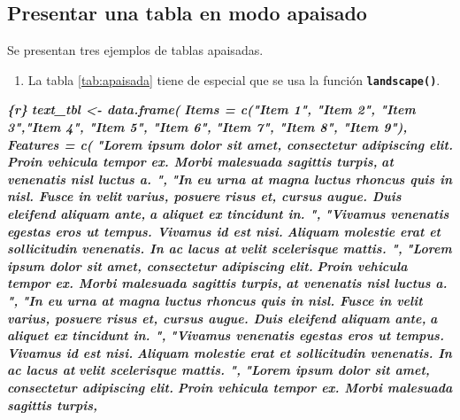 \documentclass[12pt,a4paper,oneside,]{book}
\newenvironment{Shaded}{\begin{snugshade}}{\end{snugshade}}
\newcommand{\InformationTok}[1]{\textcolor[rgb]{0.56,0.35,0.01}{\textbf{\textit{#1}}}}
\providecommand{\tightlist}{%
  \setlength{\itemsep}{0pt}\setlength{\parskip}{0pt}}
\numberwithin{dummy}{section}
\theoremstyle{ocrenumbox}
\theoremstyle{blacknumex}
\theoremstyle{blacknumbox}
\theoremstyle{ocrenum}
\theoremstyle{ocrenum}
\begin{document}
\hypertarget{presentar-una-tabla-en-modo-apaisado}{%
\subsection{Presentar una tabla en modo
apaisado}\label{presentar-una-tabla-en-modo-apaisado}}

Se presentan tres ejemplos de tablas apaisadas.

\begin{enumerate}
\def\labelenumi{\arabic{enumi}.}
\tightlist
\item
  La tabla \ref{tab:apaisada} tiene de especial que se usa la función
  \textbf{\texttt{landscape()}}.
\end{enumerate}

\begin{Shaded}
\begin{Highlighting}[]
\InformationTok{\textasciigrave{}\textasciigrave{}\textasciigrave{}\{r\}}
\InformationTok{text\_tbl \textless{}{-} data.frame(}
\InformationTok{  Items = c("Item 1", "Item 2", "Item 3","Item 4", "Item 5", "Item 6",}
\InformationTok{    "Item 7", "Item 8", "Item 9"), }
\InformationTok{  Features = c(}
\InformationTok{    "Lorem ipsum dolor sit amet, consectetur adipiscing elit.}
\InformationTok{    Proin vehicula tempor ex. Morbi malesuada sagittis turpis,}
\InformationTok{    at venenatis nisl luctus a. ",}
\InformationTok{    "In eu urna at magna luctus rhoncus quis in nisl. Fusce in velit}
\InformationTok{    varius, posuere risus et, cursus augue. Duis eleifend aliquam ante,}
\InformationTok{    a aliquet ex tincidunt in. ",}
\InformationTok{    "Vivamus venenatis egestas eros ut tempus. Vivamus id est nisi.}
\InformationTok{    Aliquam molestie erat et sollicitudin venenatis. In ac lacus at}
\InformationTok{    velit scelerisque mattis. ",}
\InformationTok{    "Lorem ipsum dolor sit amet, consectetur adipiscing elit.}
\InformationTok{    Proin vehicula tempor ex. Morbi malesuada sagittis turpis,}
\InformationTok{    at venenatis nisl luctus a. ",}
\InformationTok{    "In eu urna at magna luctus rhoncus quis in nisl. Fusce in velit}
\InformationTok{    varius, posuere risus et, cursus augue. Duis eleifend aliquam ante,}
\InformationTok{    a aliquet ex tincidunt in. ",}
\InformationTok{    "Vivamus venenatis egestas eros ut tempus. Vivamus id est nisi.}
\InformationTok{    Aliquam molestie erat et sollicitudin venenatis. In ac lacus at}
\InformationTok{    velit scelerisque mattis. ",}
\InformationTok{    "Lorem ipsum dolor sit amet, consectetur adipiscing elit.}
\InformationTok{    Proin vehicula tempor ex. Morbi malesuada sagittis turpis,}

\end{Highlighting}
\end{Shaded}
\end{document}
